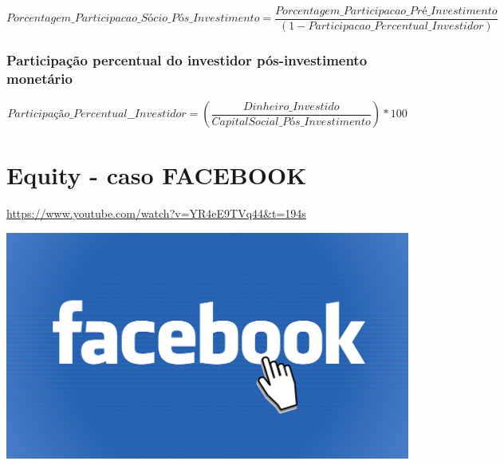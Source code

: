 \documentclass[
]{book}
\begin{document}
\[
Porcentagem\_Participacao\_Sócio\_Pós\_Investimento = \frac{Porcentagem\_Participacao\_Pré\_Investimento}{(1 - Participacao\_Percentual\_Investidor)}
\]

\subsubsection{Participação percentual do investidor pós-investimento monetário}\label{participauxe7uxe3o-percentual-do-investidor-puxf3s-investimento-monetuxe1rio}

\[
Participação\_Percentual\_\_Investidor = (\frac{ Dinheiro\_Investido}{ CapitalSocial\_Pós\_Investimento}) * 100%
\]

\section{Equity - caso FACEBOOK}\label{equity---caso-facebook}

\url{https://www.youtube.com/watch?v=YR4eE9TVq44&t=194s}

\includegraphics[width=7.04167in,height=\textheight]{images/03-2025-08-19_20/05-facebook.png}
\end{document}
